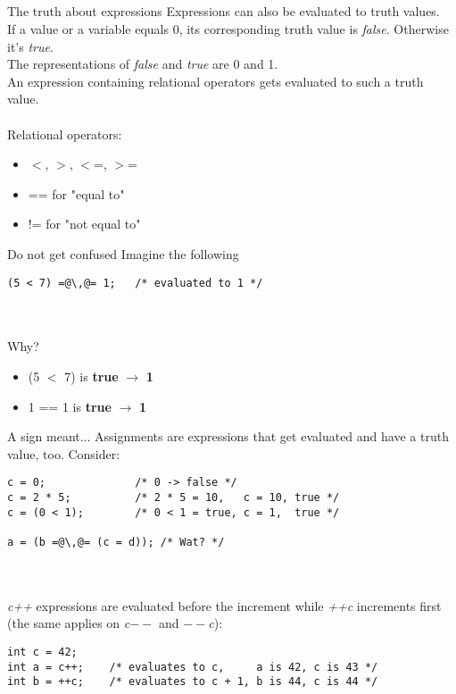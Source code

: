 \subsection{}
\begin{frame}{The truth about expressions}
	Expressions can also be evaluated to truth values.\\
	If a value or a variable equals 0, its corresponding truth value is \textit{false}. Otherwise it's \textit{true}.\\
	The representations of \textit{false} and \textit{true} are 0 and 1.\\
	An expression containing relational operators gets evaluated to such a truth value.\\
	\ \\Relational operators:
	\begin{itemize}
		\item $<$, $>$, $<$=, $>$=
		\item == for "equal to"
		\item != for "not equal to"
	\end{itemize}
\end{frame}
\begin{frame}[fragile]{Do not get confused}
	Imagine the following
	\begin{lstlisting}[numbers=none]
(5 < 7) =@\,@= 1;	/* evaluated to 1 */
\end{lstlisting}
\ \\\ \\Why?
\begin{itemize}
	\item<2-> (5 $<$ 7) is \textbf{true} $\rightarrow$ \textbf{1}
	\item<3-> 1 == 1 is \textbf{true} $\rightarrow$ \textbf{1}
\end{itemize}
\end{frame}
\begin{frame}[fragile]{A sign meant...}
	Assignments are expressions that get evaluated and have a truth value, too.
	Consider:
		\begin{lstlisting}[numbers=none]
c = 0;				/* 0 -> false */
c = 2 * 5;			/* 2 * 5 = 10,	 c = 10, true */
c = (0 < 1);		/* 0 < 1 = true, c = 1,	 true */

a = (b =@\,@= (c = d));	/* Wat? */
\end{lstlisting}\ \\
	\pause
	\ \\\textit{c++} expressions are evaluated before the increment while \textit{++c} increments first (the same applies on \textit{c$--$} and \textit{$--$c}):
	\begin{lstlisting}[numbers=none]
int c = 42;
int a = c++;	/* evaluates to c,	   a is 42, c is 43 */
int b = ++c;	/* evaluates to c + 1, b is 44, c is 44 */
\end{lstlisting}
\end{frame}
